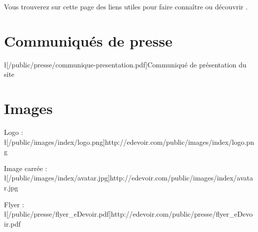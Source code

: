 Vous trouverez sur cette page des liens utiles pour faire connaître ou découvrir \eDevoir.

\section{Communiqués de presse}
\item \l[/public/presse/communique-presentation.pdf]{Communiqué de présentation du site}

\section{Images}
\item Logo : \l[/public/images/index/logo.png]{http://edevoir.com/public/images/index/logo.png}
\item Image carrée : \l[/public/images/index/avatar.jpg]{http://edevoir.com/public/images/index/avatar.jpg}
\item Flyer : \l[/public/presse/flyer_eDevoir.pdf]{http://edevoir.com/public/presse/flyer_eDevoir.pdf}